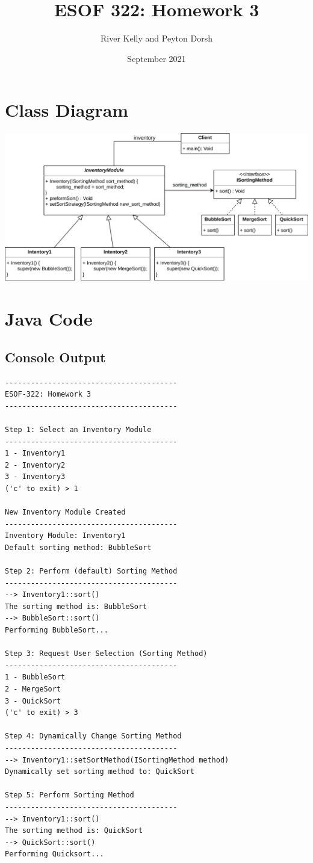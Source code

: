 \documentclass[12pt]{article}
\title{ESOF 322: Homework 3}
\author{River Kelly and Peyton Dorsh}
\date{September 2021}
\begin{document}
\maketitle
\newpage
\section*{Class Diagram}
\includegraphics[width=\linewidth]{Class-Diagram.png}
\newpage
\section*{Java Code}

\subsection*{Console Output}
\begin{lstlisting}
----------------------------------------
ESOF-322: Homework 3
----------------------------------------

Step 1: Select an Inventory Module
----------------------------------------
1 - Inventory1
2 - Inventory2
3 - Inventory3
('c' to exit) > 1

New Inventory Module Created
----------------------------------------
Inventory Module: Inventory1 
Default sorting method: BubbleSort

Step 2: Perform (default) Sorting Method
----------------------------------------
--> Inventory1::sort()
The sorting method is: BubbleSort
--> BubbleSort::sort()
Performing BubbleSort...

Step 3: Request User Selection (Sorting Method)
----------------------------------------
1 - BubbleSort
2 - MergeSort
3 - QuickSort
('c' to exit) > 3

Step 4: Dynamically Change Sorting Method
----------------------------------------
--> Inventory1::setSortMethod(ISortingMethod method)
Dynamically set sorting method to: QuickSort

Step 5: Perform Sorting Method
----------------------------------------
--> Inventory1::sort()
The sorting method is: QuickSort
--> QuickSort::sort()
Performing Quicksort...
\end{lstlisting}
\end{document}

